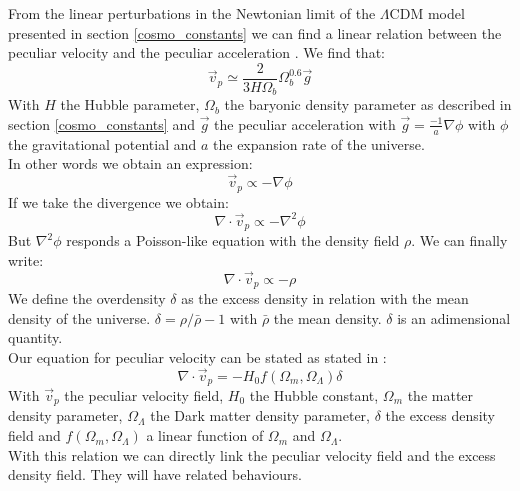 \documentclass[12pt]{article}
\begin{document}
\begin{par}
From the linear perturbations in the Newtonian limit of
 the $\Lambda$CDM model presented in section
  \ref{cosmo_constants} we can find a linear relation
   between the peculiar velocity and the peculiar
    acceleration \cite{padmanabhan_theoretical_2000}.
     We find that:
\[
\vec{v}_p \simeq \frac{2}{3 H \Omega_b} \Omega_{b}^{0.6} \vec{g}
\]
With $H$ the Hubble parameter,
 $\Omega_b$ the baryonic density parameter as
 described in section \ref{cosmo_constants} and $\vec{g}$ the
  peculiar acceleration with $\vec{g} = \frac{-1}{a}
   \nabla \phi $ with $\phi$ the gravitational
    potential and $a$ the expansion rate of the universe.\\
In other words we obtain an expression:
\[ 
\vec{v}_p \propto  - \nabla \phi
\]
If we take the divergence we obtain:
\[
\nabla \cdot \vec{v}_p \propto - \nabla^2 \phi
\]
But $\nabla^2 \phi$ responds a Poisson-like equation
 with the density field $\rho$. We can finally write:
\[
\nabla \cdot \vec{v}_p \propto - \rho
\]
We define the overdensity $\delta$ as the excess density
 in relation with the mean density of the universe.
 $\delta = \rho / \bar{\rho} -1$ with $\bar{\rho}$ the
  mean density. $\delta$ is an adimensional quantity. \\

Our equation for peculiar velocity can be stated as
 stated in
 \cite{tully_laniakea_2014}: 
\[
\nabla \cdot \vec{v}_p = - H_0 f(\Omega_m, \Omega_{\Lambda}) \delta
\] 
With $\vec{v}_p$ the peculiar velocity field, $H_0$ the
 Hubble constant, $\Omega_m$ the matter density
  parameter, $\Omega_{\Lambda}$ the Dark matter density
   parameter, $\delta$ the excess density field and $f(\Omega_m, \Omega_{\Lambda})$ a linear function of $\Omega_m$ and $\Omega_{\Lambda}$.\\
   With this relation we can directly link the peculiar
    velocity field and the excess density field. They
     will have related behaviours.
\end{par}
\end{document}
